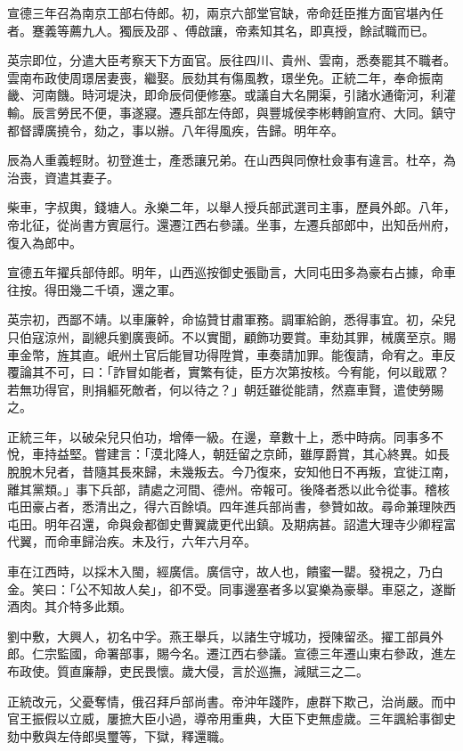 \begin{pinyinscope}
宣德三年召為南京工部右侍郎。初，兩京六部堂官缺，帝命廷臣推方面官堪內任者。蹇義等薦九人。獨辰及邵、傅啟讓，帝素知其名，即真授，餘試職而已。

英宗即位，分遣大臣考察天下方面官。辰往四川、貴州、雲南，悉奏罷其不職者。雲南布政使周璟居妻喪，繼娶。辰劾其有傷風教，璟坐免。正統二年，奉命振南畿、河南饑。時河堤決，即命辰伺便修塞。或議自大名開渠，引諸水通衛河，利灌輸。辰言勞民不便，事遂寢。遷兵部左侍郎，與豐城侯李彬轉餉宣府、大同。鎮守都督譚廣撓令，劾之，事以辦。八年得風疾，告歸。明年卒。

辰為人重義輕財。初登進士，產悉讓兄弟。在山西與同僚杜僉事有違言。杜卒，為治喪，資遣其妻子。

柴車，字叔輿，錢塘人。永樂二年，以舉人授兵部武選司主事，歷員外郎。八年，帝北征，從尚書方賓扈行。還遷江西右參議。坐事，左遷兵部郎中，出知岳州府，復入為郎中。

宣德五年擢兵部侍郎。明年，山西巡按御史張勖言，大同屯田多為豪右占據，命車往按。得田幾二千頃，還之軍。

英宗初，西鄙不靖。以車廉幹，命協贊甘肅軍務。調軍給餉，悉得事宜。初，朵兒只伯寇涼州，副總兵劉廣喪師。不以實聞，顧飾功要賞。車劾其罪，械廣至京。賜車金幣，旌其直。岷州土官后能冒功得陞賞，車奏請加罪。能復請，命宥之。車反覆論其不可，曰：「詐冒如能者，實繁有徒，臣方次第按核。今宥能，何以戢眾？若無功得官，則捐軀死敵者，何以待之？」朝廷雖從能請，然嘉車賢，遣使勞賜之。

正統三年，以破朵兒只伯功，增俸一級。在邊，章數十上，悉中時病。同事多不悅，車持益堅。嘗建言：「漠北降人，朝廷留之京師，雖厚爵賞，其心終異。如長脫脫木兒者，昔隨其長來歸，未幾叛去。今乃復來，安知他日不再叛，宜徙江南，離其黨類。」事下兵部，請處之河間、德州。帝報可。後降者悉以此令從事。稽核屯田豪占者，悉清出之，得六百餘頃。四年進兵部尚書，參贊如故。尋命兼理陜西屯田。明年召還，命與僉都御史曹翼歲更代出鎮。及期病甚。詔遣大理寺少卿程富代翼，而命車歸治疾。未及行，六年六月卒。

車在江西時，以採木入閩，經廣信。廣信守，故人也，饋蜜一罌。發視之，乃白金。笑曰：「公不知故人矣」，卻不受。同事邊塞者多以宴樂為豪舉。車惡之，遂斷酒肉。其介特多此類。

劉中敷，大興人，初名中孚。燕王舉兵，以諸生守城功，授陳留丞。擢工部員外郎。仁宗監國，命署部事，賜今名。遷江西右參議。宣德三年遷山東右參政，進左布政使。質直廉靜，吏民畏懷。歲大侵，言於巡撫，減賦三之二。

正統改元，父憂奪情，俄召拜戶部尚書。帝沖年踐阼，慮群下欺己，治尚嚴。而中官王振假以立威，屢摭大臣小過，導帝用重典，大臣下吏無虛歲。三年諷給事御史劾中敷與左侍郎吳璽等，下獄，釋還職。


\end{pinyinscope}
